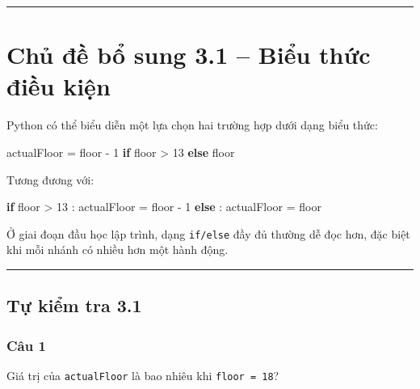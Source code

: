 \documentclass[
  11pt,
  a4paper,
]{article}
\newenvironment{Shaded}{}{}
\newcommand{\ControlFlowTok}[1]{\textcolor[rgb]{0.00,0.44,0.13}{\textbf{#1}}}
\newcommand{\DecValTok}[1]{\textcolor[rgb]{0.25,0.63,0.44}{#1}}
\newcommand{\NormalTok}[1]{#1}
\newcommand{\OperatorTok}[1]{\textcolor[rgb]{0.40,0.40,0.40}{#1}}
\begin{document}
\begin{center}\rule{0.5\linewidth}{0.5pt}\end{center}

\section{Chủ đề bổ sung 3.1 -- Biểu thức điều
kiện}\label{chux1ee7-ux111ux1ec1-bux1ed5-sung-3.1-biux1ec3u-thux1ee9c-ux111iux1ec1u-kiux1ec7n}

Python có thể biểu diễn một lựa chọn hai trường hợp dưới dạng biểu thức:

\begin{Shaded}
\begin{Highlighting}[]
\NormalTok{actualFloor }\OperatorTok{=}\NormalTok{ floor }\OperatorTok{{-}} \DecValTok{1} \ControlFlowTok{if}\NormalTok{ floor }\OperatorTok{\textgreater{}} \DecValTok{13} \ControlFlowTok{else}\NormalTok{ floor}
\end{Highlighting}
\end{Shaded}

Tương đương với:

\begin{Shaded}
\begin{Highlighting}[]
\ControlFlowTok{if}\NormalTok{ floor }\OperatorTok{\textgreater{}} \DecValTok{13}\NormalTok{ :}
\NormalTok{    actualFloor }\OperatorTok{=}\NormalTok{ floor }\OperatorTok{{-}} \DecValTok{1}
\ControlFlowTok{else}\NormalTok{ :}
\NormalTok{    actualFloor }\OperatorTok{=}\NormalTok{ floor}
\end{Highlighting}
\end{Shaded}

Ở giai đoạn đầu học lập trình, dạng \texttt{if/else} đầy đủ thường dễ
đọc hơn, đặc biệt khi mỗi nhánh có nhiều hơn một hành động.

\begin{center}\rule{0.5\linewidth}{0.5pt}\end{center}

\subsection{Tự kiểm tra 3.1}\label{tux1ef1-kiux1ec3m-tra-3.1}

\subsubsection{Câu 1}\label{cuxe2u-1}

Giá trị của \texttt{actualFloor} là bao nhiêu khi \texttt{floor\ =\ 18}?
\end{document}
